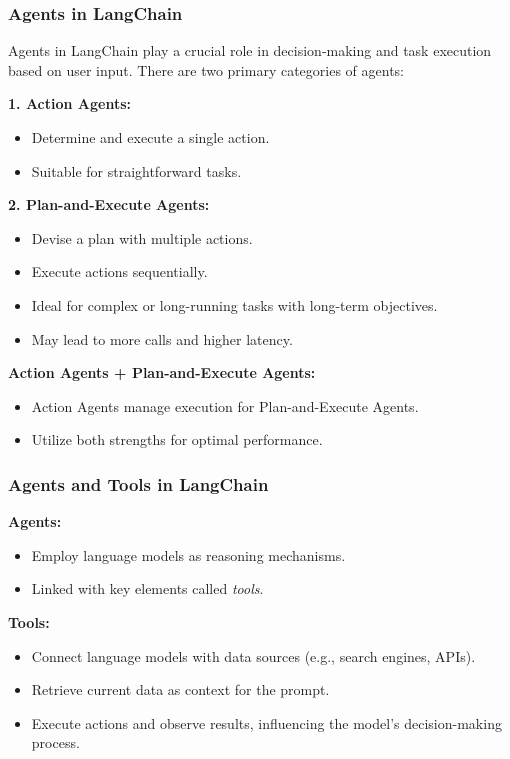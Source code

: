 \begin{frame}[fragile]
\frametitle{Agents in LangChain}

Agents in LangChain play a crucial role in decision-making and task execution based on user input. There are two primary categories of agents:

\textbf{1. Action Agents:}
\begin{itemize}
    \item Determine and execute a single action.
    \item Suitable for straightforward tasks.
\end{itemize}

\textbf{2. Plan-and-Execute Agents:}
\begin{itemize}
    \item Devise a plan with multiple actions.
    \item Execute actions sequentially.
    \item Ideal for complex or long-running tasks with long-term objectives.
    \item May lead to more calls and higher latency.
\end{itemize}

\textbf{Action Agents + Plan-and-Execute Agents:}
\begin{itemize}
    \item Action Agents manage execution for Plan-and-Execute Agents.
    \item Utilize both strengths for optimal performance.
\end{itemize}

\end{frame}


\begin{frame}[fragile]
\frametitle{Agents and Tools in LangChain}

\textbf{Agents:}
\begin{itemize}
    \item Employ language models as reasoning mechanisms.
    \item Linked with key elements called \textit{tools}.
\end{itemize}

\textbf{Tools:}
\begin{itemize}
    \item Connect language models with data sources (e.g., search engines, APIs).
    \item Retrieve current data as context for the prompt.
    \item Execute actions and observe results, influencing the model's decision-making process.
\end{itemize}

\end{frame}

